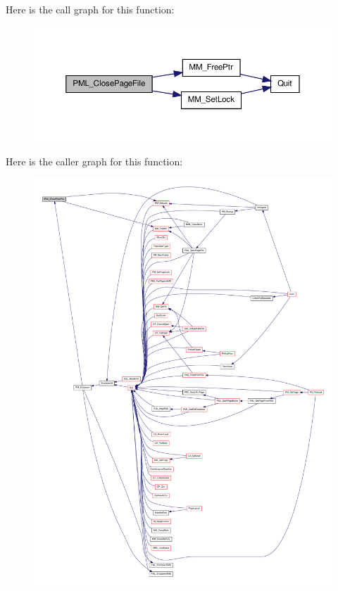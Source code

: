 Here is the call graph for this function:
\nopagebreak
\begin{figure}[H]
\begin{center}
\leavevmode
\includegraphics[width=368pt]{ID__PM_8C_a5a2578fa944d0908a0d43e7f362036cb_cgraph}
\end{center}
\end{figure}




Here is the caller graph for this function:
\nopagebreak
\begin{figure}[H]
\begin{center}
\leavevmode
\includegraphics[width=400pt]{ID__PM_8C_a5a2578fa944d0908a0d43e7f362036cb_icgraph}
\end{center}
\end{figure}


